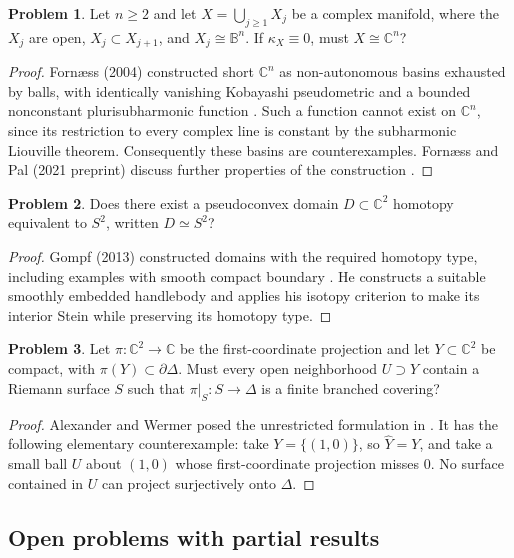 \documentclass[11pt,reqno]{amsart}
\theoremstyle{definition}
\newtheorem{problem}{Problem}[section]
\theoremstyle{remark}
\begin{document}
\begin{problem}\label{FS-2.5a}
Let $n\geq2$ and let $X=\bigcup_{j\geq1}X_j$ be a complex manifold, where the $X_j$ are open, $X_j\subset X_{j+1}$, and $X_j\cong\mathbb B^n$. If $\kappa_X\equiv0$, must $X\cong\mathbb C^n$?
\end{problem}
\begin{proof}
Forn\ae ss (2004) constructed short $\mathbb C^n$ as non-autonomous basins exhausted by balls, with identically vanishing Kobayashi pseudometric and a bounded nonconstant plurisubharmonic function \cite{FS-Short}. Such a function cannot exist on $\mathbb C^n$, since its restriction to every complex line is constant by the subharmonic Liouville theorem. Consequently these basins are counterexamples. Forn\ae ss and Pal (2021 preprint) discuss further properties of the construction \cite{FS-ShortNotes}.
\end{proof}

\begin{problem}\label{b95-7-1-1}
Does there exist a pseudoconvex domain $D\subset\mathbb C^2$ homotopy equivalent to $S^2$, written $D\simeq S^2$?
\end{problem}
\begin{proof}
Gompf (2013) constructed domains with the required homotopy type, including examples with smooth compact boundary \cite{B95-Gompf}. He constructs a suitable smoothly embedded handlebody and applies his isotopy criterion to make its interior Stein while preserving its homotopy type.
\end{proof}

\begin{problem}\label{b95-11-2-1}
Let $\pi:\mathbb C^2\to\mathbb C$ be the first-coordinate projection and let $Y\subset\mathbb C^2$ be compact, with $\pi(Y)\subset\partial\Delta$. Must every open neighborhood $U\supset\widehat Y$ contain a Riemann surface $S$ such that $\pi|_S:S\to\Delta$ is a finite branched covering?
\end{problem}
\begin{proof}
Alexander and Wermer posed the unrestricted formulation in \cite[Problem~11.2.1]{B95}. It has the following elementary counterexample: take $Y=\{(1,0)\}$, so $\widehat Y=Y$, and take a small ball $U$ about $(1,0)$ whose first-coordinate projection misses $0$. No surface contained in $U$ can project surjectively onto $\Delta$.
\end{proof}

\subsection{Open problems with partial results}
\end{document}
